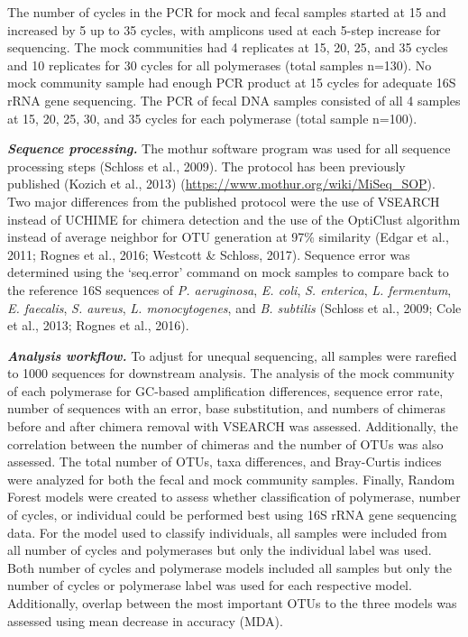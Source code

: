 \documentclass[11pt,]{article}
\begin{document}
The number of cycles in the PCR for mock and fecal samples started at 15
and increased by 5 up to 35 cycles, with amplicons used at each 5-step
increase for sequencing. The mock communities had 4 replicates at 15,
20, 25, and 35 cycles and 10 replicates for 30 cycles for all
polymerases (total samples n=130). No mock community sample had enough
PCR product at 15 cycles for adequate 16S rRNA gene sequencing. The PCR
of fecal DNA samples consisted of all 4 samples at 15, 20, 25, 30, and
35 cycles for each polymerase (total sample n=100).

\textbf{\emph{Sequence processing.}} The mothur software program was
used for all sequence processing steps (Schloss et al., 2009). The
protocol has been previously published (Kozich et al., 2013)
(\url{https://www.mothur.org/wiki/MiSeq_SOP}). Two major differences
from the published protocol were the use of VSEARCH instead of UCHIME
for chimera detection and the use of the OptiClust algorithm instead of
average neighbor for OTU generation at 97\% similarity (Edgar et al.,
2011; Rognes et al., 2016; Westcott \& Schloss, 2017). Sequence error
was determined using the `seq.error' command on mock samples to compare
back to the reference 16S sequences of \emph{P. aeruginosa}, \emph{E.
coli}, \emph{S. enterica}, \emph{L. fermentum}, \emph{E. faecalis},
\emph{S. aureus}, \emph{L. monocytogenes}, and \emph{B. subtilis}
(Schloss et al., 2009; Cole et al., 2013; Rognes et al., 2016).

\textbf{\emph{Analysis workflow.}} To adjust for unequal sequencing, all
samples were rarefied to 1000 sequences for downstream analysis. The
analysis of the mock community of each polymerase for GC-based
amplification differences, sequence error rate, number of sequences with
an error, base substitution, and numbers of chimeras before and after
chimera removal with VSEARCH was assessed. Additionally, the correlation
between the number of chimeras and the number of OTUs was also assessed.
The total number of OTUs, taxa differences, and Bray-Curtis indices were
analyzed for both the fecal and mock community samples. Finally, Random
Forest models were created to assess whether classification of
polymerase, number of cycles, or individual could be performed best
using 16S rRNA gene sequencing data. For the model used to classify
individuals, all samples were included from all number of cycles and
polymerases but only the individual label was used. Both number of
cycles and polymerase models included all samples but only the number of
cycles or polymerase label was used for each respective model.
Additionally, overlap between the most important OTUs to the three
models was assessed using mean decrease in accuracy (MDA).
\end{document}
